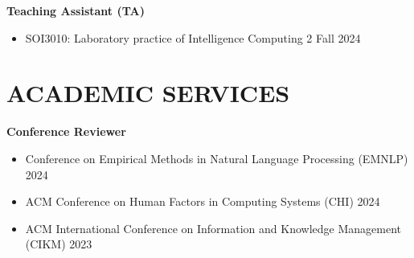 \documentclass[a4paper,11pt]{article}
\newcommand{\resumeItem}[2]{
  \item{
    \textbf{#1}{\hspace{0.5mm}#2 \vspace{-0.5mm}}
  }
}
\newcommand{\resumeSubItem}[2]{\resumeItem{#1}{#2}\vspace{-4pt}}
\newcommand{\resumeHeadingSkillStart}{\begin{itemize}[leftmargin=*,itemsep=1.7mm, rightmargin=2ex]}
\newcommand{\resumeItemListStart}{\begin{itemize}[leftmargin=*,labelsep=1mm,itemsep=0.5mm]}
\newcommand{\resumeHeadingSkillEnd}{\end{itemize}\vspace{-2mm}}
\newcommand{\resumeItemListEnd}{\end{itemize}\vspace{-2mm}}
\begin{document}
\textbf{Teaching Assistant (TA)}
\vspace{-0.7mm}
\resumeItemListStart
  \item SOI3010: Laboratory practice of Intelligence Computing 2 \hfill Fall 2024 \\
\resumeItemListEnd




\section{\textbf{ACADEMIC SERVICES}}

\textbf{Conference Reviewer}
\vspace{-0.7mm}
\resumeItemListStart
  \item Conference on Empirical Methods in Natural Language Processing (EMNLP) \hfill 2024 \\
  \item ACM Conference on Human Factors in Computing Systems (CHI) \hfill 2024 \\
  \item ACM International Conference on Information and Knowledge Management (CIKM) \hfill 2023 \\
\resumeItemListEnd
\vspace{1.0mm}

\end{document}
